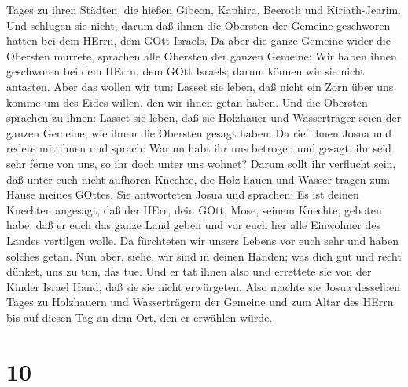 Tages zu ihren Städten, die hießen Gibeon, Kaphira, Beeroth und
Kiriath-Jearim.  Und schlugen sie nicht, darum daß ihnen
die Obersten der Gemeine geschworen hatten bei dem HErrn, dem GOtt
Israels. Da aber die ganze Gemeine wider die Obersten murrete,
 sprachen alle Obersten der ganzen Gemeine: Wir haben ihnen
geschworen bei dem HErrn, dem GOtt Israels; darum können wir sie nicht
antasten.  Aber das wollen wir tun: Lasset sie leben, daß
nicht ein Zorn über uns komme um des Eides willen, den wir ihnen getan
haben.  Und die Obersten sprachen zu ihnen: Lasset sie
leben, daß sie Holzhauer und Wasserträger seien der ganzen Gemeine, wie
ihnen die Obersten gesagt haben.  Da rief ihnen Josua und
redete mit ihnen und sprach: Warum habt ihr uns betrogen und gesagt, ihr
seid sehr ferne von uns, so ihr doch unter uns wohnet? 
Darum sollt ihr verflucht sein, daß unter euch nicht aufhören Knechte,
die Holz hauen und Wasser tragen zum Hause meines GOttes. 
Sie antworteten Josua und sprachen: Es ist deinen Knechten angesagt, daß
der HErr, dein GOtt, Mose, seinem Knechte, geboten habe, daß er euch das
ganze Land geben und vor euch her alle Einwohner des Landes vertilgen
wolle. Da fürchteten wir unsers Lebens vor euch sehr und haben solches
getan.  Nun aber, siehe, wir sind in deinen Händen; was
dich gut und recht dünket, uns zu tun, das tue.  Und er tat
ihnen also und errettete sie von der Kinder Israel Hand, daß sie sie
nicht erwürgeten.  Also machte sie Josua desselben Tages zu
Holzhauern und Wasserträgern der Gemeine und zum Altar des HErrn bis auf
diesen Tag an dem Ort, den er erwählen würde.

\hypertarget{section-9}{%
\section{10}\label{section-9}}

